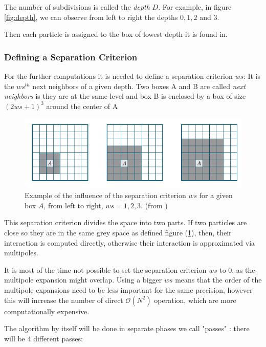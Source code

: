\documentclass[11pt,twoside,a4paper]{report}
\begin{document}
    
    The number of subdivisions is called the \textit{depth} $D$. For example, in figure \ref{fig:depth}, we can observe from left to right the depths $0,1,2$ and $3$.
    
    Then each particle is assigned  to the box of lowest depth it is found in.
    
	\subsubsection{Defining a Separation Criterion}
	
	For the further computations it is needed to define a separation criterion $ws$: It is the $ws^{th}$ next neighbors of a given depth. Two boxes A and B are called \textit{next neighbors} is they are at the same level and box B is enclosed by a box of size $(2 ws + 1)^3$ around the center of A 
	
	
	
	
	\begin{figure}[H]
    \includegraphics[scale=0.7]{separation}    
    \centering 
    \caption{Example of the influence of the separation criterion $ws$ for a given box $A$, from left to right, $ws = 1,2,3$. (from \cite{phdIvo})}    
    \label{fig:separation}
     \end{figure}
	
		This separation criterion divides the space into two parts. If two particles are close so they are in the same grey space as defined figure (\ref{fig:separation}), then, their interaction is computed directly, otherwise their interaction is approximated via multipoles.
	
	It is most of the time not possible to set the separation criterion $ws$ to 0, as the multipole expansion might overlap. Using a bigger $ws$ means that the order of the multipole expansions need to be less important for the same precision, however this will increase the number of direct $\mathcal{O}(N^2)$ operation, which are  more computationally expensive.       
    
    
	The algorithm by itself will be done in separate phases we call "passes" : there will be 4 different passes:
	
\end{document}

